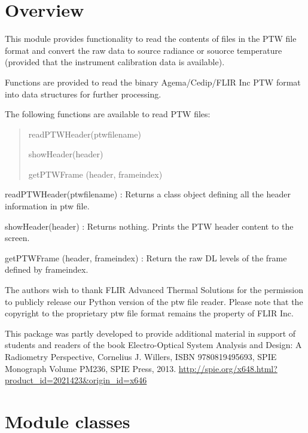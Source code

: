 \documentclass[a4paper,10pt,english]{sphinxmanual}
\begin{document}
\section{Overview}
\label{ryptw:module-pyradi.ryptw}\label{ryptw:overview}
This module provides functionality to read the contents of files in the
PTW file format and convert the raw data to source radiance or souorce
temperature (provided that the instrument calibration data is available).

Functions are provided to read the binary Agema/Cedip/FLIR Inc PTW format
into data structures for further processing.

The following functions are available to read PTW files:
\begin{quote}

\begin{DUlineblock}{0em}
\item[] readPTWHeader(ptwfilename)
\item[] showHeader(header)
\item[] getPTWFrame (header, frameindex)
\end{DUlineblock}
\end{quote}

readPTWHeader(ptwfilename) :
Returns a class object defining all the header information in ptw file.

showHeader(header) :
Returns nothing.  Prints the PTW header content to the screen.

getPTWFrame (header, frameindex) :
Return the raw DL levels of the frame defined by frameindex.

The authors wish to thank FLIR Advanced Thermal Solutions for the permission
to publicly release our Python version of the ptw file reader.  Please note that the
copyright to the proprietary ptw file format remains the property of FLIR Inc.

This package was partly developed to provide additional material in support of students
and readers of the book Electro-Optical System Analysis and Design: A Radiometry
Perspective,  Cornelius J. Willers, ISBN 9780819495693, SPIE Monograph Volume
PM236, SPIE Press, 2013.  \href{http://spie.org/x648.html?product\_id=2021423\&origin\_id=x646}{http://spie.org/x648.html?product\_id=2021423\&origin\_id=x646}


\section{Module classes}
\label{ryptw:module-classes}
\end{document}

